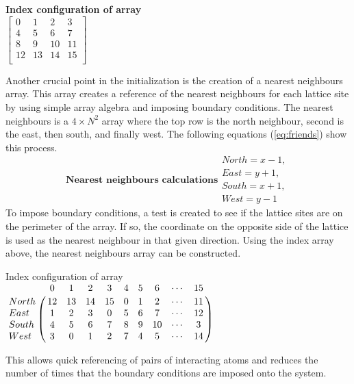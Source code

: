 \documentclass[letterpaper,12pt]{article}
\numberwithin{equation}{subsection}
\begin{document}
\begin{center}
\textbf{Index configuration of array} \\
$ \begin{bmatrix}
0 & 1 & 2 & 3 \\
4 & 5 & 6 & 7 \\
8 & 9 & 10 & 11 \\
12 & 13 & 14 & 15 \\
\end{bmatrix}$
\end{center}
\indent Another crucial point in the initialization is the creation of a nearest neighbours array. This array creates a reference of the nearest neighbours for each lattice site by using simple array algebra and imposing boundary conditions. The nearest neighbours is a $4 \times N^2$ array where the top row is the north neighbour, second is the east, then south, and finally west. The following equations (\eqref{eq:friends}) show this process. \\
\begin{subequations}
\textbf{Nearest neighbours calculations}
\label{eq:friends}
\begin{align}
North = x-1, \\
East = y+1, \\
South = x+1, \\
West = y-1
\end{align}
\end{subequations}
To impose boundary conditions, a test is created to see if the lattice sites are on the perimeter of the array. If so, the coordinate on the opposite side of the lattice is used as the nearest neighbour in that given direction. Using the index array above, the nearest neighbours array can be constructed.
\begin{center}
Index configuration of array \\
$
\bordermatrix{~ & 0 & 1 & 2 & 3 & 4 & 5 & 6 & \cdots & 15 \cr
North & 12 & 13 & 14 & 15 & 0 & 1 & 2 & \cdots & 11 \cr
East  & 1 & 2 & 3 & 0 & 5 & 6 & 7 & \cdots & 12 \cr
South & 4 & 5 & 6 & 7 & 8 & 9 & 10 & \cdots & 3 \cr
West  & 3 & 0 & 1 & 2 & 7 & 4 & 5 & \cdots & 14 \cr}
$
\end{center}
This allows quick referencing of pairs of interacting atoms and reduces the number of times that the boundary conditions are imposed onto the system.
\end{document}

